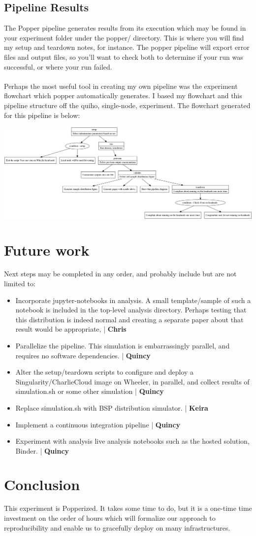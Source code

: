 \documentclass[12pt]{article}
\begin{document}
\subsection*{Pipeline Results}
The Popper pipeline generates results from its execution which may be found in your experiment folder under the popper/ directory. This is where you will find my setup and teardown notes, for instance. The popper pipeline will export error files and output files, so you'll want to check both to determine if your run was successful, or where your run failed.

\paragraph{}
Perhaps the most useful tool in creating my own pipeline was the experiment flowchart which popper automatically generates. I based my flowchart and this pipeline structure off the quiho, single-node, experiment. The flowchart generated for this pipeline is below:
\begin{center}
\includegraphics[scale=0.2]{../../wf.png}
\end{center}
\section*{Future work}
Next steps may be completed in any order, and probably include but are not limited to:
\begin{itemize}
\item Incorporate jupyter-notebooks in analysis. A small template/sample of such a notebook is included in the top-level analysis directory. Perhaps testing that this distribution is indeed normal and creating a separate paper about that result would be appropriate, | \textbf{Chris}
\item Parallelize the pipeline. This simulation is embarrassingly parallel, and requires no software dependencies. | \textbf{Quincy}
\item Alter the setup/teardown scripts to configure and deploy a Singularity/CharlieCloud image on Wheeler, in parallel, and collect results of simulation.sh or some other simulation | \textbf{Quincy}
\item Replace simulation.sh with BSP distribution simulator. | \textbf{Keira}
\item Implement a continuous integration pipeline | \textbf{Quincy}
\item Experiment with analysis live analysis notebooks such as the hosted solution, Binder. | \textbf{Quincy}
\end{itemize}

\section*{Conclusion}
This experiment is Popperized. It takes some time to do, but it is a one-time time investment on the order of hours which will formalize our approach to reproducibility and enable us to gracefully deploy on many infrastructures.
\end{document}
